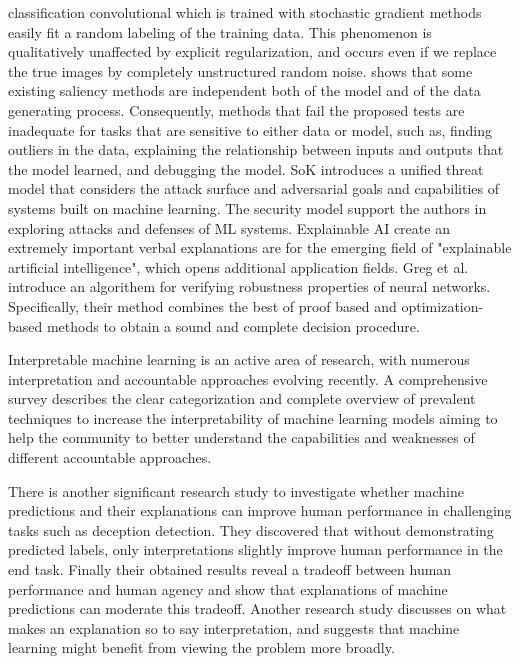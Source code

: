 classification convolutional which is trained with stochastic gradient methods easily fit a random labeling of the training data. This phenomenon is qualitatively unaffected by explicit regularization, and occurs even if we replace the true images by completely unstructured random noise. \cite{adebayo2018sanity} shows that some existing saliency methods are independent both of the model and of the data generating process. Consequently, methods that fail the proposed tests are inadequate for tasks that are sensitive to either data or model, such as, finding outliers in the data, explaining the relationship between inputs and outputs that the model learned, and debugging the model. SoK \cite{papernot2016towards} introduces a unified threat model that considers the attack surface and adversarial goals and capabilities of systems built on machine learning. The security model support the authors in exploring attacks and defenses of ML systems. Explainable AI \cite{goebel2018explainable} create an extremely important verbal explanations are  for the emerging field of "explainable artificial intelligence", which opens additional application fields. Greg et al. \cite{anderson2019optimization} introduce an algorithem for verifying robustness properties of neural networks. Specifically, their method combines the best of proof based and optimization-based methods to obtain a sound and complete decision procedure. 

Interpretable machine learning is an active area of research, with  numerous interpretation and accountable approaches evolving recently. A comprehensive survey \cite{du2018techniques} describes the clear categorization and complete overview of prevalent techniques to increase the interpretability of machine learning models aiming to help the community to better understand the capabilities and weaknesses of different accountable approaches.

There is another significant research study \cite{lai2018human} to investigate whether machine predictions and their explanations can improve human performance in challenging tasks such as deception detection. They discovered that without demonstrating predicted labels, only interpretations  slightly improve human performance in the end task. Finally their obtained results reveal a tradeoff between human performance and human agency and show that explanations of machine predictions can moderate this tradeoff. Another research study \cite{yang2019learn} discusses on what makes an explanation so to say interpretation, and suggests that machine learning might benefit from viewing the problem more broadly.
